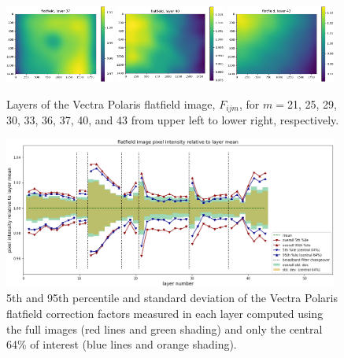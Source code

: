 \documentclass[letterpaper,11pt]{article}
\begin{document}
\begin{figure}[!ht]
\includegraphics[width=0.32\textwidth]{images/results/flatfield_layers_polaris/flatfield_layer_37}
\includegraphics[width=0.32\textwidth]{images/results/flatfield_layers_polaris/flatfield_layer_40}
\includegraphics[width=0.32\textwidth]{images/results/flatfield_layers_polaris/flatfield_layer_43}
\caption{\footnotesize Layers of the Vectra Polaris flatfield image, $F_{ijm}$, for $m=$21, 25, 29, 30, 33, 36, 37, 40, and 43 from upper left to lower right, respectively.}
\label{fig:flatfield_image_layers_polaris_2}
\end{figure}

\begin{figure}[!ht]
\centering
\includegraphics[width=0.98\textwidth]{images/results/flatfield_pixel_intensities_polaris}
\caption{\footnotesize 5th and 95th percentile and standard deviation of the Vectra Polaris flatfield correction factors measured in each layer computed using the full images (red lines and green shading) and only the central 64\% of interest (blue lines and orange shading).}
\label{fig:flatfield_pixel_intensities_polaris}
\end{figure} 
\end{document}
